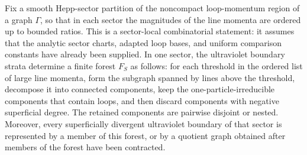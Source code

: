 \begin{lemma}
\label{lem:hepp-sector-forest-extraction}
Fix a smooth Hepp-sector partition of the noncompact loop-momentum region of
a graph \(\Gamma\), so that in each sector the magnitudes of the line momenta
are ordered up to bounded ratios.  This is a sector-local combinatorial
statement: it assumes that the analytic sector charts, adapted loop bases, and
uniform comparison constants have already been supplied.  In one sector, the
ultraviolet boundary strata determine a finite forest \(F_S\) as follows: for
each threshold in the ordered list of large line momenta, form the subgraph
spanned by lines above the threshold, decompose it into connected components,
keep the one-particle-irreducible components that contain loops, and then
discard components with negative superficial degree.  The retained components
are pairwise disjoint or nested.  Moreover, every superficially divergent
ultraviolet boundary of that sector is represented by a member of this forest,
or by a quotient graph obtained after members of the forest have been
contracted.
\end{lemma}

